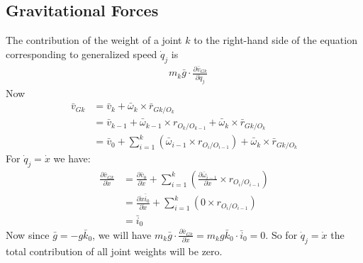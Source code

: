 \documentclass[a4paper,10pt]{article}
\begin{document}
\subsection{Gravitational Forces}
The contribution of the weight of a joint $k$ to the right-hand side of the equation corresponding to generalized speed
$\dot{q}_j$ is
\begin{align}
 &m_k\bar{g} \cdot \frac{\partial \bar{v}_{Gk}}{\partial \dot{q}_j} \label{gravity1}
\end{align}
Now
\begin{align}
 \bar{v}_{Gk} &= \bar{v}_k + \bar\omega_k \times \bar{r}_{Gk/O_k} \nonumber \\
 &= \bar{v}_{k-1} + \bar\omega_{k-1} \times r_{O_{k}/O_{k-1}} + \bar\omega_k \times \bar{r}_{Gk/O_k} \nonumber \\
 &= \bar{v}_0 + \sum\limits_{i=1}^{k} \left( \bar\omega_{i-1} \times r_{O_{i}/O_{i-1}} \right) + \bar\omega_k \times \bar{r}_{Gk/O_k}  \nonumber 
\end{align}
For $\dot{q}_j = \dot{x}$ we have:
\begin{align}
 \frac{\partial \bar{v}_{Gk}}{\partial \dot{x}} &= \frac{\partial \bar{v}_0}{\partial \dot{x}} + \sum\limits_{i=1}^{k} \left( \frac{\partial \bar\omega_{i-1}}{\partial \dot{x}} \times r_{O_{i}/O_{i-1}} \right) \nonumber \\
  &= \frac{\partial \dot{x}\bar{i}_0}{\partial \dot{x}} + \sum\limits_{i=1}^{k} \left( 0 \times r_{O_{i}/O_{i-1}} \right) \nonumber \\
  &= \bar{i}_0
\end{align}
Now since $\bar{g} = -g\bar{k}_0$, we will have $m_k\bar{g} \cdot \frac{\partial \bar{v}_{Gk}}{\partial \dot{x}} = m_kg\bar{k}_0 \cdot \bar{i}_0 = 0$. So for $\dot{q}_j = \dot{x}$ the total contribution of all joint weights will be zero. 
\end{document}
